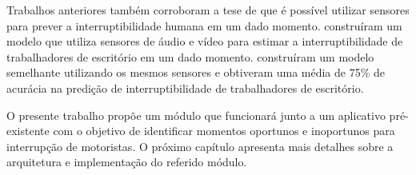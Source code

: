 Trabalhos anteriores também corroboram a tese de que é possível utilizar sensores para prever a interruptibilidade
humana em um dado momento.  construíram um modelo que utiliza sensores de áudio e vídeo
para estimar a interruptibilidade de trabalhadores de escritório em um dado momento. 
construíram um modelo semelhante utilizando os mesmos sensores e obtiveram uma média de 75\% de acurácia na predição de
interruptibilidade de trabalhadores de escritório.

O presente trabalho propõe um módulo que funcionará junto a um aplicativo pré-existente com o objetivo de identificar momentos
oportunos e inoportunos para interrupção de motoristas. O próximo capítulo apresenta mais detalhes sobre a arquitetura e
implementação do referido módulo.
